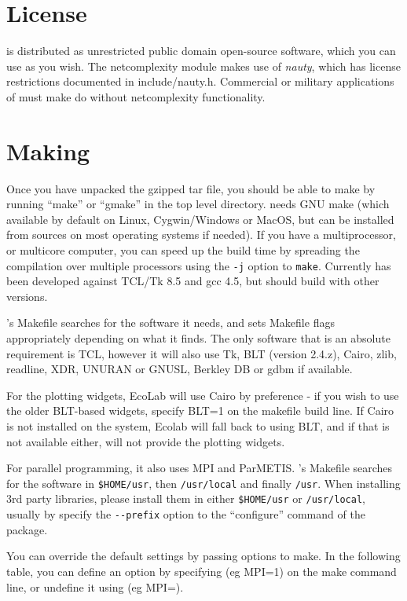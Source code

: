 \section{License}

\EcoLab{} is distributed as unrestricted public domain open-source
software, which you can use as you wish. The netcomplexity module
makes use of {\em nauty}, which has license restrictions documented in
include/nauty.h. Commercial or military applications of \EcoLab{} must
make do without netcomplexity functionality.

\section{Making \protect\EcoLab}

Once you have unpacked the gzipped tar file, you should be able to
make \EcoLab{} by running ``make'' or ``gmake'' in the top level
directory. \EcoLab{} needs GNU make (which available by default on
Linux, Cygwin/Windows or MacOS, but can be installed from sources on
most operating systems if needed). If you have a multiprocessor, or
multicore computer, you can speed up the build time by spreading the
compilation over multiple processors using the \verb+-j+ option to \verb+make+.
Currently \EcoLab{} has been developed against TCL/Tk 8.5 and gcc 4.5,
but should build with other versions.

\EcoLab{}'s Makefile searches for the software it needs, and sets
Makefile flags appropriately depending on what it finds. The only
software that is an absolute requirement is TCL, however it will also
use Tk, BLT (version 2.4.z), Cairo, zlib, readline, XDR, UNURAN or GNUSL,
Berkley DB or gdbm if available. 

For the plotting widgets, EcoLab will use Cairo by preference - if you
wish to use the older BLT-based widgets, specify BLT=1 on the makefile
build line. If Cairo is not installed on the system, Ecolab will fall
back to using BLT, and if that is not available either, will not
provide the plotting widgets.

For parallel programming, it also uses MPI and ParMETIS. \EcoLab{}'s
Makefile searches for the software in \verb+$HOME/usr+, then
\verb+/usr/local+ and finally \verb+/usr+. When installing 3rd party
libraries, please install them in either \verb+$HOME/usr+ or
\verb+/usr/local+, usually by specify the \verb+--prefix+ option to
the ``configure'' command of the package.

You can override the default settings by passing options to make. In
the following table, you can define an option by specifying (eg MPI=1)
on the make command line, or undefine it using (eg MPI=).

